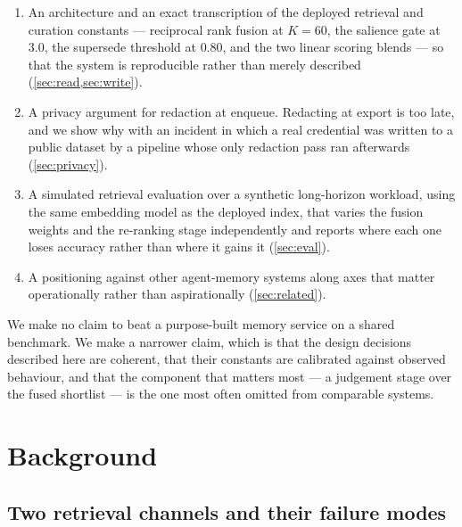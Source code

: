 \documentclass[10pt,twocolumn]{article}
\begin{document}
\begin{enumerate}[leftmargin=1.15em,itemsep=1pt,topsep=2pt]
\item An architecture and an exact transcription of the deployed retrieval and
      curation constants --- reciprocal rank fusion at $K=60$, the salience gate
      at $3.0$, the supersede threshold at $0.80$, and the two linear scoring
      blends --- so that the system is reproducible rather than merely
      described (\cref{sec:read,sec:write}).
\item A privacy argument for redaction at enqueue. Redacting at export is too
      late, and we show why with an incident in which a real credential was
      written to a public dataset by a pipeline whose only redaction pass ran
      afterwards (\cref{sec:privacy}).
\item A simulated retrieval evaluation over a synthetic long-horizon workload,
      using the same embedding model as the deployed index, that varies the
      fusion weights and the re-ranking stage independently and reports where
      each one loses accuracy rather than where it gains it (\cref{sec:eval}).
\item A positioning against other agent-memory systems along axes that matter
      operationally rather than aspirationally (\cref{sec:related}).
\end{enumerate}

We make no claim to beat a purpose-built memory service on a shared benchmark.
We make a narrower claim, which is that the design decisions described here are
coherent, that their constants are calibrated against observed behaviour, and
that the component that matters most --- a judgement stage over the fused
shortlist --- is the one most often omitted from comparable systems.

\section{Background}
\label{sec:background}

\subsection{Two retrieval channels and their failure modes}
\end{document}
